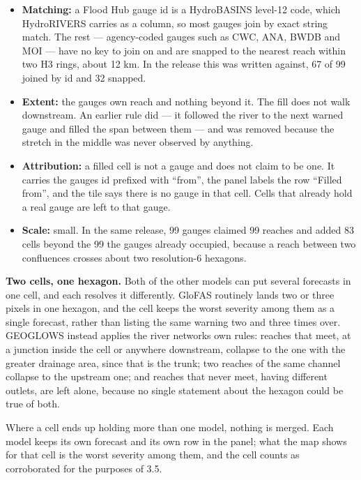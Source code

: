 \begin{itemize}
\item
  \textbf{Matching:} a Flood Hub gauge id is a HydroBASINS level-12 code, which HydroRIVERS carries as a column, so most gauges join by exact string match. The rest --- agency-coded gauges such as CWC, ANA, BWDB and MOI --- have no key to join on and are snapped to the nearest reach within two H3 rings, about 12 km. In the release this was written against, 67 of 99 joined by id and 32 snapped.
\item
  \textbf{Extent:} the gauge\textquotesingle s own reach and nothing beyond it. The fill does not walk downstream. An earlier rule did --- it followed the river to the next warned gauge and filled the span between them --- and was removed because the stretch in the middle was never observed by anything.
\item
  \textbf{Attribution:} a filled cell is not a gauge and does not claim to be one. It carries the gauge\textquotesingle s id prefixed with ``from'', the panel labels the row ``Filled from'', and the tile says there is no gauge in that cell. Cells that already hold a real gauge are left to that gauge.
\item
  \textbf{Scale:} small. In the same release, 99 gauges claimed 99 reaches and added 83 cells beyond the 99 the gauges already occupied, because a reach between two confluences crosses about two resolution-6 hexagons.
\end{itemize}

\textbf{Two cells, one hexagon.} Both of the other models can put several forecasts in one cell, and each resolves it differently. GloFAS routinely lands two or three pixels in one hexagon, and the cell keeps the worst severity among them as a single forecast, rather than listing the same warning two and three times over. GEOGLOWS instead applies the river network\textquotesingle s own rules: reaches that meet, at a junction inside the cell or anywhere downstream, collapse to the one with the greater drainage area, since that is the trunk; two reaches of the same channel collapse to the upstream one; and reaches that never meet, having different outlets, are left alone, because no single statement about the hexagon could be true of both.

Where a cell ends up holding more than one model, nothing is merged.
Each model keeps its own forecast and its own row in the panel; what the map shows for that cell is the worst severity among them, and the cell counts as corroborated for the purposes of 3.5.

